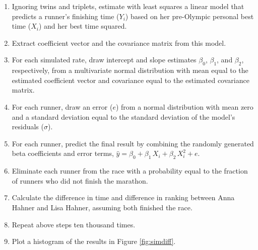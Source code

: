 \documentclass[12pt,titlepage]{article}
\begin{document}
\begin{enumerate}
\item Ignoring twins and triplets, estimate with least squares a
  linear model that predicts a runner's finishing time ($Y_i$) based
  on her pre-Olympic personal best time ($X_i$) and her best time
  squared.
\item Extract coefficient vector and the covariance matrix from this
  model.
\item For each simulated rate, draw intercept and slope estimates
  $\beta_0$, $\beta_1$, and $\beta_2$, respectively, from a
  multivariate normal distribution with mean equal to the estimated
  coefficient vector and covariance equal to the estimated covariance
  matrix.
\item For each runner, draw an error ($e$) from a normal distribution
  with mean zero and a standard deviation equal to the standard
  deviation of the model's residuals ($\sigma$).
\item For each runner, predict the final result by combining the randomly
  generated beta coefficients and error terms, $\hat{y} = \beta_0 +
  \beta_1\,X_i + \beta_2\,X_i^2 + e$.
\item Eliminate each runner from the race with a probability equal to
  the fraction of runners who did not finish the marathon.
\item Calculate the difference in time and difference in ranking
  between Anna Hahner and Lisa Hahner, assuming both finished the
  race.
\item Repeat above steps ten thousand times.
\item Plot a histogram of the results in Figure \ref{fig:simdiff}.
\end{enumerate}
\end{document}
